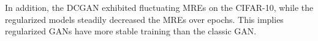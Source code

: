 In addition, the DCGAN exhibited fluctuating MREs on the CIFAR-10, while the regularized models steadily decreased the MREs over epochs. This implies regularized GANs have more stable training than the classic GAN. %


